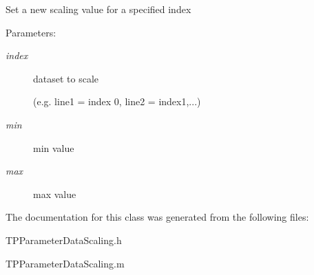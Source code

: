 Set a new scaling value for a specified index \begin{Desc}
\item[Parameters:]
\begin{description}
\item[{\em index}]dataset to scale\par
 (e.g. line1 = index 0, line2 = index1,...) \item[{\em min}]min value \item[{\em max}]max value \end{description}
\end{Desc}


The documentation for this class was generated from the following files:\begin{CompactItemize}
\item 
TPParameterDataScaling.h\item 
TPParameterDataScaling.m\end{CompactItemize}
